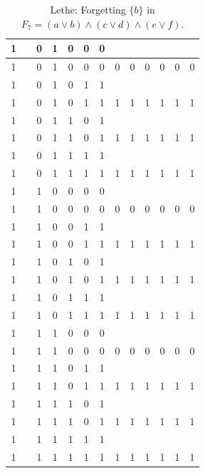 \begin{table}[!tb]
\begin{tabular}{|c|c|c|c|c|c|c|c|c|c|c|c|c|}
        \rowcolor{gray!40} 1 &  & 0 & 1 & 0 & 0 & 0 &  &  &  &  &  &  \\ \hline
        \rowcolor{gray!40} 1 &  & 0 & 1 & 0 & 0 & 0 & 0 & 0 & 0 & 0 & 0 & 0 \\ \hline
        \rowcolor{blue!40} 1 &  & 0 & 1 & 0 & 1 & 1 &  &  &  &  &  &  \\ \hline
        \rowcolor{blue!40} 1 &  & 0 & 1 & 0 & 1 & 1 & 1 & 1 & 1 & 1 & 1 & 1 \\ \hline
        \rowcolor{red!40} 1 &  & 0 & 1 & 1 & 0 & 1 &  &  &  &  &  &  \\ \hline
        \rowcolor{red!40} 1 &  & 0 & 1 & 1 & 0 & 1 & 1 & 1 & 1 & 1 & 1 & 1 \\ \hline
        \rowcolor{green!40} 1 &  & 0 & 1 & 1 & 1 & 1 &  &  &  &  &  &  \\ \hline
        \rowcolor{green!40} 1 &  & 0 & 1 & 1 & 1 & 1 & 1 & 1 & 1 & 1 & 1 & 1 \\ \hline
        \rowcolor{yellow!40} 1 &  & 1 & 0 & 0 & 0 & 0 &  &  &  &  &  &  \\ \hline
        \rowcolor{yellow!40} 1 &  & 1 & 0 & 0 & 0 & 0 & 0 & 0 & 0 & 0 & 0 & 0 \\ \hline
        \rowcolor{gray!40} 1 &  & 1 & 0 & 0 & 1 & 1 &  &  &  &  &  &  \\ \hline
        \rowcolor{gray!40} 1 &  & 1 & 0 & 0 & 1 & 1 & 1 & 1 & 1 & 1 & 1 & 1 \\ \hline
        \rowcolor{blue!40} 1 &  & 1 & 0 & 1 & 0 & 1 &  &  &  &  &  &  \\ \hline
        \rowcolor{blue!40} 1 &  & 1 & 0 & 1 & 0 & 1 & 1 & 1 & 1 & 1 & 1 & 1 \\ \hline
        \rowcolor{red!40} 1 &  & 1 & 0 & 1 & 1 & 1 &  &  &  &  &  &  \\ \hline
        \rowcolor{red!40} 1 &  & 1 & 0 & 1 & 1 & 1 & 1 & 1 & 1 & 1 & 1 & 1 \\ \hline
        \rowcolor{green!40} 1 &  & 1 & 1 & 0 & 0 & 0 &  &  &  &  &  &  \\ \hline
        \rowcolor{green!40} 1 &  & 1 & 1 & 0 & 0 & 0 & 0 & 0 & 0 & 0 & 0 & 0 \\ \hline
        \rowcolor{yellow!40} 1 &  & 1 & 1 & 0 & 1 & 1 &  &  &  &  &  &  \\ \hline
        \rowcolor{yellow!40} 1 &  & 1 & 1 & 0 & 1 & 1 & 1 & 1 & 1 & 1 & 1 & 1 \\ \hline
        \rowcolor{gray!40} 1 &  & 1 & 1 & 1 & 0 & 1 &  &  &  &  &  &  \\ \hline
        \rowcolor{gray!40} 1 &  & 1 & 1 & 1 & 0 & 1 & 1 & 1 & 1 & 1 & 1 & 1 \\ \hline
        \rowcolor{blue!40} 1 &  & 1 & 1 & 1 & 1 & 1 &  &  &  &  &  &  \\ \hline
        \rowcolor{blue!40} 1 &  & 1 & 1 & 1 & 1 & 1 & 1 & 1 & 1 & 1 & 1 & 1 \\ \hline
    \end{tabular}
    \caption{Lethe: Forgetting $\{b\}$ in $F_{7} = (a \lor b) \land (c \lor d) \land (e \lor f)$.}
    \label{tab:lethe-F7-b}
\end{table}
